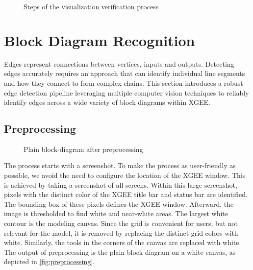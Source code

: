 \begin{figure*}[htb]
  \centering
  \caption{Steps of the visualization verification process}
  
  \label{fig:recognition_overview}
\end{figure*}


\section{Block Diagram Recognition}
Edges represent connections between vertices, inputs and outputs. Detecting edges accurately requires an approach that can identify individual line segments and how they connect to form complex chains. This section introduces a robust edge detection pipeline leveraging multiple computer vision techniques to reliably identify edges across a wide variety of block diagrams within XGEE. 

\subsection{Preprocessing}

\begin{figure}[htb]
  \centering
  \caption{Plain block-diagram after preprocessing}
  
  \label{fig:preprocessing}
\end{figure}

The process starts with a screenshot. To make the process as user-friendly as possible, we avoid the need to configure the location of the XGEE window. This is achieved by taking a screenshot of all screens. Within this large screenshot, pixels with the distinct color of the XGEE title bar and status bar are identified. The bounding box of these pixels defines the XGEE window. Afterward, the image is thresholded to find white and near-white areas. The largest white contour is the modeling canvas. Since the grid is convenient for users, but not relevant for the model, it is removed by replacing the distinct grid colors with white. Similarly, the tools in the corners of the canvas are replaced with white. The output of preprocessing is the plain block diagram on a white canvas, as depicted in \autoref{fig:preprocessing}.


